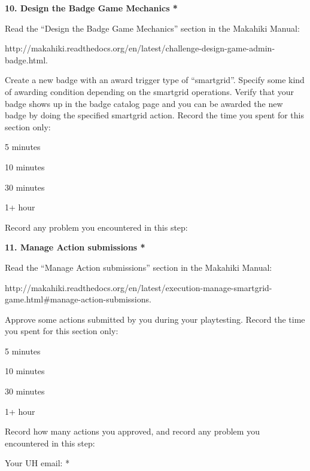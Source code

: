 {\bf 10. Design the Badge Game Mechanics *}

Read the ``Design the Badge Game Mechanics'' section in the Makahiki Manual:

http://makahiki.readthedocs.org/en/latest/challenge-design-game-admin-badge.html. 

Create a new badge with an award trigger type of ``smartgrid''. Specify some kind of awarding condition depending on the smartgrid operations. Verify that your badge shows up in the badge catalog page and you can be awarded the new badge by doing the specified smartgrid action. Record the time you spent for this section only:

\begin{radiobutton}
\item 5 minutes
\item  10 minutes
\item  30 minutes
\item  1+ hour
\end{radiobutton}

Record any problem you encountered in this step: \underline{\hspace{4cm}}

{\bf 11. Manage Action submissions *}

Read the ``Manage Action submissions'' section in the Makahiki Manual:

http://makahiki.readthedocs.org/en/latest/execution-manage-smartgrid-game.html\#manage-action-submissions.

 Approve some actions submitted by you during your playtesting. Record the time you spent for this section only:

\begin{radiobutton}
\item 5 minutes
\item  10 minutes
\item  30 minutes
\item  1+ hour
\end{radiobutton}

Record how many actions you approved, and record any problem you encountered in this step: 

\underline{\hspace{4cm}}

Your UH email: * \underline{\hspace{4cm}}
